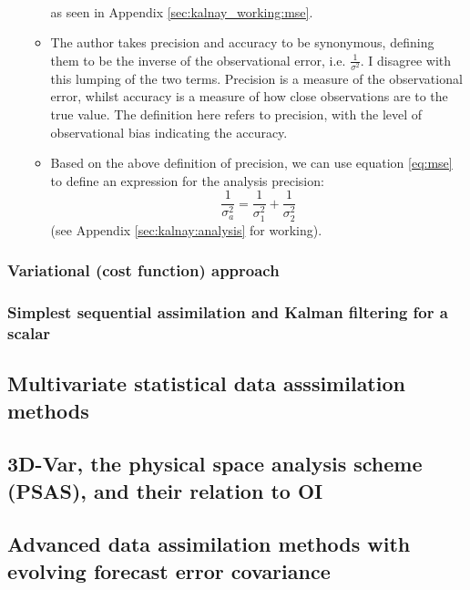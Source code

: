 \begin{itemize}
\begin{itemize}
\begin{subequations}
\begin{align}
            \end{align}
        \end{subequations}
        as seen in Appendix \ref{sec:kalnay_working:mse}.
        \item  The author takes precision and accuracy to be synonymous, defining them to be the inverse of the observational error, i.e. $\frac{1}{\sigma^2}$. I disagree with this lumping of the two terms. Precision is a measure of the observational error, whilst accuracy is a measure of how close observations are to the true value. The definition here refers to precision, with the level of observational bias indicating the accuracy.
        \item Based on the above definition of precision, we can use equation \ref{eq:mse} to define an expression for the analysis precision:
        \begin{equation}
            \frac{1}{\sigma_a^2} = \frac{1}{\sigma_1^2} + \frac{1}{\sigma_2^2} \label{eq:}
        \end{equation}
        (see Appendix \ref{sec:kalnay:analysis} for working).
    \end{itemize}
\end{itemize}

\subsubsection{Variational (cost function) approach}
\label{subs:squares:variational}

\subsubsection{Simplest sequential assimilation and Kalman filtering for a scalar}
\label{subs:squares:sequential}

\subsection{Multivariate statistical data asssimilation methods}
\label{sub:data_assimilation:multivar}

\subsection{3D-Var, the physical space analysis scheme (PSAS), and their relation to OI}
\label{sub:data_assimilation:3d-var}

\subsection{Advanced data assimilation methods with evolving forecast error covariance}
\label{sub:data_assimilation:advanced}

